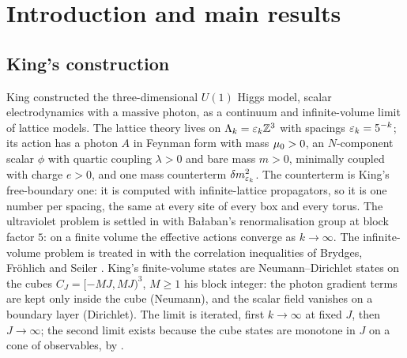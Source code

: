 \section{Introduction and main results}

\subsection{King's construction}

King \cite{K1,K2} constructed the three-dimensional $U(1)$ Higgs model, scalar electrodynamics with a
massive photon, as a continuum and infinite-volume limit of lattice models. The lattice theory lives on
$\Lambda_k=\varepsilon_k\mathbb Z^3$ with spacings $\varepsilon_k=5^{-k}$; its action has a photon $A$ in Feynman form with mass
$\mu_0>0$, an $N$-component scalar $\phi$ with quartic coupling $\lambda>0$ and bare mass $m>0$, minimally
coupled with charge $e>0$, and one mass counterterm $\delta m^2_{\varepsilon_k}$. The counterterm is King's free-boundary
one: it is computed with infinite-lattice propagators, so it is one number per spacing, the same at every
site of every box and every torus. The ultraviolet problem is settled in \cite{K1} with Ba{\l}aban's
renormalisation group \cite{Ba1,Ba2,Ba3,Ba4} at block factor $5$: on a finite volume the effective
actions converge as $k\to\infty$. The infinite-volume problem is treated in \cite{K2} with the correlation
inequalities of Brydges, Fr\"ohlich and Seiler \cite{BFS1}. King's finite-volume states are
Neumann--Dirichlet states on the cubes $C_J=[-MJ,MJ)^3$, $M\ge1$ his block integer: the photon gradient
terms are kept only inside the cube (Neumann), and the scalar field vanishes on a boundary layer
(Dirichlet). The limit is iterated, first $k\to\infty$ at fixed $J$, then $J\to\infty$; the second limit
exists because the cube states are monotone in $J$ on a cone of observables, by \cite{BFS1}.

